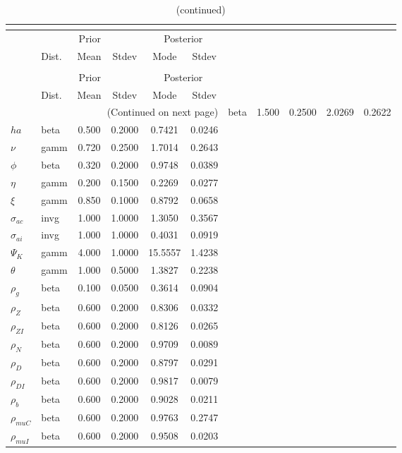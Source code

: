  
\begin{center}
\begin{longtable}{llcccc} 
\caption{Results from posterior maximization (parameters)}\\
 \label{Table:Posterior:1}\\
\toprule 
  & \multicolumn{3}{c}{Prior}  &  \multicolumn{2}{c}{Posterior} \\
  \cmidrule(r{.75em}){2-4} \cmidrule(r{.75em}){5-6}
  & Dist. & Mean  & Stdev & Mode & Stdev \\ 
\midrule \endfirsthead 
\caption{(continued)}\\
 \bottomrule 
  & \multicolumn{3}{c}{Prior}  &  \multicolumn{2}{c}{Posterior} \\
  \cmidrule(r{.75em}){2-4} \cmidrule(r{.75em}){5-6}
  & Dist. & Mean  & Stdev & Mode & Stdev \\ 
\midrule \endhead 
\bottomrule \multicolumn{6}{r}{(Continued on next page)}\endfoot 
\bottomrule\endlastfoot 
${\sigma}$ & beta &   1.500 & 0.2500 &   2.0269 &  0.2622 \\ 
${ha}$ & beta &   0.500 & 0.2000 &   0.7421 &  0.0246 \\ 
$\nu$ & gamm &   0.720 & 0.2500 &   1.7014 &  0.2643 \\ 
${\phi}$ & beta &   0.320 & 0.2000 &   0.9748 &  0.0389 \\ 
${\eta}$ & gamm &   0.200 & 0.1500 &   0.2269 &  0.0277 \\ 
$\xi$ & gamm &   0.850 & 0.1000 &   0.8792 &  0.0658 \\ 
${\sigma_{ac}}$ & invg &   1.000 & 1.0000 &   1.3050 &  0.3567 \\ 
${\sigma_{ai}}$ & invg &   1.000 & 1.0000 &   0.4031 &  0.0919 \\ 
${\Psi_{K}}$ & gamm &   4.000 & 1.0000 &  15.5557 &  1.4238 \\ 
${\theta}$ & gamm &   1.000 & 0.5000 &   1.3827 &  0.2238 \\ 
${\rho_g}$ & beta &   0.100 & 0.0500 &   0.3614 &  0.0904 \\ 
${\rho_Z}$ & beta &   0.600 & 0.2000 &   0.8306 &  0.0332 \\ 
${\rho_{ZI}}$ & beta &   0.600 & 0.2000 &   0.8126 &  0.0265 \\ 
${\rho_N}$ & beta &   0.600 & 0.2000 &   0.9709 &  0.0089 \\ 
${\rho_D}$ & beta &   0.600 & 0.2000 &   0.8797 &  0.0291 \\ 
${\rho_{DI}}$ & beta &   0.600 & 0.2000 &   0.9817 &  0.0079 \\ 
${\rho_b}$ & beta &   0.600 & 0.2000 &   0.9028 &  0.0211 \\ 
${\rho_{muC}}$ & beta &   0.600 & 0.2000 &   0.9763 &  0.2747 \\ 
${\rho_{muI}}$ & beta &   0.600 & 0.2000 &   0.9508 &  0.0203 \\ 
\end{longtable}
 \end{center}
